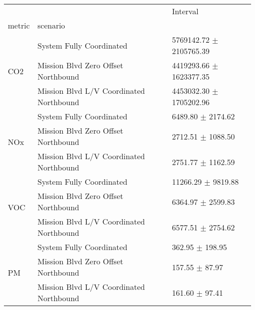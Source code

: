 \begin{tabular}{lll}
\toprule
 &  & Interval \\
metric & scenario &  \\
\midrule
\multirow[t]{3}{*}{CO2} & System Fully Coordinated & 5769142.72 $\pm$ 2105765.39 \\
 & Mission Blvd Zero Offset Northbound & 4419293.66 $\pm$ 1623377.35 \\
 & Mission Blvd L/V Coordinated Northbound & 4453032.30 $\pm$ 1705202.96 \\
\multirow[t]{3}{*}{NOx} & System Fully Coordinated & 6489.80 $\pm$ 2174.62 \\
 & Mission Blvd Zero Offset Northbound & 2712.51 $\pm$ 1088.50 \\
 & Mission Blvd L/V Coordinated Northbound & 2751.77 $\pm$ 1162.59 \\
\multirow[t]{3}{*}{VOC} & System Fully Coordinated & 11266.29 $\pm$ 9819.88 \\
 & Mission Blvd Zero Offset Northbound & 6364.97 $\pm$ 2599.83 \\
 & Mission Blvd L/V Coordinated Northbound & 6577.51 $\pm$ 2754.62 \\
\multirow[t]{3}{*}{PM} & System Fully Coordinated & 362.95 $\pm$ 198.95 \\
 & Mission Blvd Zero Offset Northbound & 157.55 $\pm$ 87.97 \\
 & Mission Blvd L/V Coordinated Northbound & 161.60 $\pm$ 97.41 \\
\bottomrule
\end{tabular}

